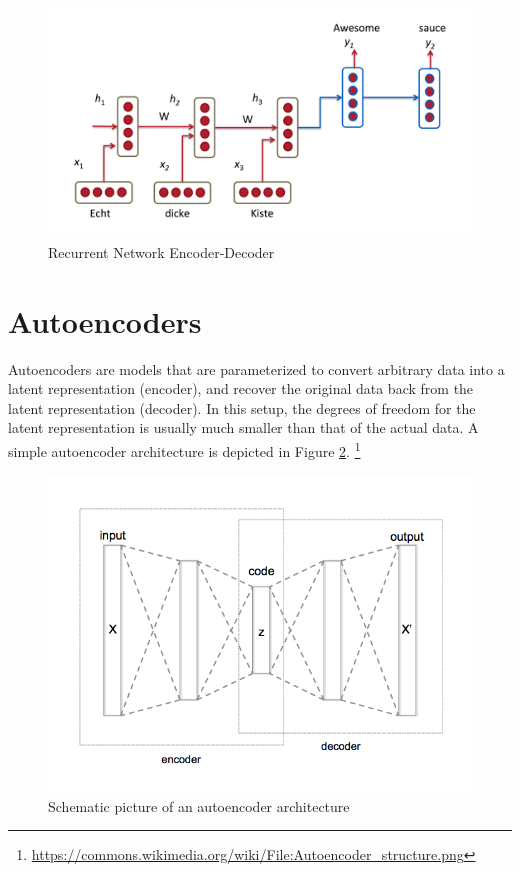 \begin{figure}[ht]
	\centering
	\includegraphics[width=.8\textwidth]{images/rnn-nmt}
	\caption{\label{fig:rnn-nmt} Recurrent Network Encoder-Decoder}
\end{figure}

\section{Autoencoders}

Autoencoders are models that are parameterized to convert arbitrary data into a latent representation (encoder), and recover the original data back from the latent representation (decoder). In this setup, the degrees of freedom for the latent representation is usually much smaller than that of the actual data. A simple autoencoder architecture is depicted in Figure \ref{fig:autoencoder-structure}. \footnote{\url{https://commons.wikimedia.org/wiki/File:Autoencoder_structure.png}}

\begin{figure}[ht]
	\centering
	\includegraphics[width=.8\textwidth]{images/autoencoder-structure}
	\caption{\label{fig:autoencoder-structure} Schematic picture of an autoencoder architecture}
\end{figure}

